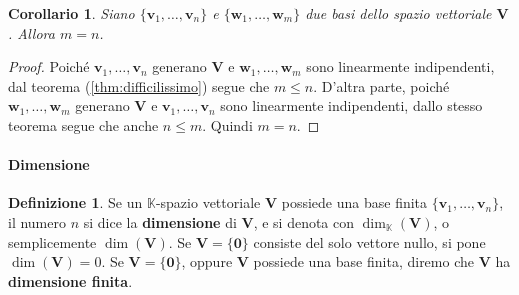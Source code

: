 \documentclass{article}
\theoremstyle{plain}
\newtheorem{cor}{Corollario}
\theoremstyle{definition}
\newtheorem{defn}{Definizione}[section]
\theoremstyle{remark}
\begin{document}
\vspace{10pt}

\begin{bxthm}
\begin{cor}\label{cor:quattrotredici}
    Siano \( \{\mathbf{v}_1, \ldots, \mathbf{v}_n\} \) e \( \{\mathbf{w}_1, \ldots, \mathbf{w}_m\} \) due basi dello spazio vettoriale \( \mathbf{V} \). 
    Allora \( m = n \).
\end{cor}
\end{bxthm}
\begin{proof}
    Poiché \( \mathbf{v}_1, \ldots, \mathbf{v}_n \) generano \( \mathbf{V} \) e \( \mathbf{w}_1, \ldots, \mathbf{w}_m \) sono linearmente indipendenti,
     dal teorema (\ref{thm:difficilissimo}) segue che \( m \leq n \). 
     D'altra parte, poiché \( \mathbf{w}_1, \ldots, \mathbf{w}_m \) generano \( \mathbf{V} \) e \( \mathbf{v}_1, \ldots, \mathbf{v}_n \) 
     sono linearmente indipendenti, dallo stesso teorema segue che anche \( n \leq m \). Quindi \( m = n \).
\end{proof}

\vspace{10pt}

\paragraph{Dimensione}
\begin{bxthm}
\begin{defn}
    Se un \( \mathbb{K} \)-spazio vettoriale \( \mathbf{V} \) possiede una base finita \( \{\mathbf{v}_1, \ldots, \mathbf{v}_n\} \), 
    il numero \( n \) si dice la \textbf{dimensione} di \( \mathbf{V} \), e si denota con \( \dim_{\mathbb{K}}(\mathbf{V}) \), o semplicemente \( \dim(\mathbf{V}) \). 
    Se \( \mathbf{V} = \{\mathbf{0}\} \) consiste del solo vettore nullo, si pone \( \dim(\mathbf{V}) = 0 \).
    Se \( \mathbf{V} = \{\mathbf{0}\} \), oppure \( \mathbf{V} \) possiede una base finita, diremo che \( \mathbf{V} \) ha \textbf{dimensione finita}.
\end{defn}
\end{bxthm}

\vspace{10pt}
\end{document}

